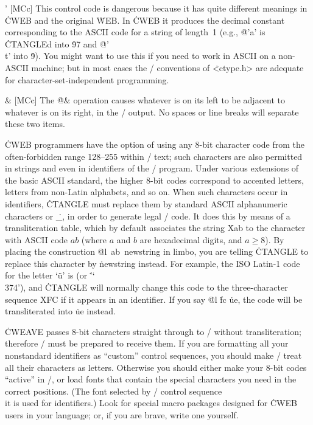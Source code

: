 \@' [MCc] This control code is dangerous because it has quite different
meanings in \.{CWEB} and the original \.{WEB}. In \.{CWEB} it produces the
decimal constant corresponding to the ASCII code for a string of length~1
(e.g., \.{@'a'} is \.{CTANGLE}d into \.{97} and \.{@'\\t'} into
\.9). You might want to use this if you need to work in ASCII on a
non-ASCII machine; but in most cases the \CEE/ conventions of
\.{<ctype.h>} are adequate for character-set-independent programming.

\@\& [MCc] The \.{@\&} operation causes whatever is on its left to be
adjacent to whatever is on its right, in the \CEE/ output. No spaces or
line breaks will separate these two items.

\@l [L] \.{CWEB} programmers have the option of using any 8-bit character
code from the often-forbidden range 128--255 within \TEX/ text; such
characters are also permitted in strings and even in identifiers of the
\CEE/ program.
Under various extensions of the basic
ASCII standard, the higher 8-bit codes correspond
to accented letters, letters from non-Latin alphabets,
and so on. When such characters occur in identifiers, \.{CTANGLE} must replace
them by standard ASCII alphanumeric characters or
\.{\_}, in order to generate legal \CEE/ code.  It does this by means
of a transliteration table, which by default associates the string
\.{Xab} to the character with ASCII code \T{\^/}$ab$ (where $a$ and $b$ are
hexadecimal digits, and $a\ge8$).  By placing the
construction \.{@l\ ab\ newstring} in limbo, you are telling
\.{CTANGLE} to replace this character by \.{newstring} instead.
For example, the ISO Latin-1 code for the letter `\"u' is 
(or \.{'\char`\\374'}),
and \.{CTANGLE} will normally change this code to the
three-character sequence \.{XFC} if it
appears in an identifier. If you say \.{@l} \.{fc} \.{ue}, the code will
be transliterated into \.{ue} instead.

\more
\.{CWEAVE} passes 8-bit characters straight through to \TEX/ without
transliteration; therefore \TEX/ must be prepared to receive them.
If you are formatting all your nonstandard identifiers as ``custom''
control sequences, you should
make \TEX/ treat all their characters as letters. Otherwise you should either
make your 8-bit codes ``active'' in \TEX/, or load fonts that
contain the special characters you need in the correct positions.
(The font selected by \TEX/ control sequence \.{\\it} is used for
identifiers.)
Look for special macro packages designed for \.{CWEB} users in your language;
or, if you are brave, write one yourself.

